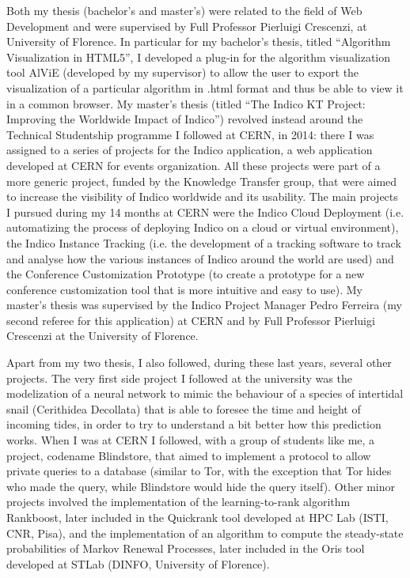 \documentclass{article}
\begin{document}
    Both my thesis (bachelor's and master's) were related to the field of Web Development and were supervised by Full Professor Pierluigi Crescenzi, at University of Florence. In particular for my bachelor's thesis, titled ``Algorithm Visualization in HTML5'', I developed a plug-in for the algorithm visualization tool AlViE (developed by my supervisor) to allow the user to export the visualization of a particular algorithm in .html format and thus be able to view it in a common browser. My master's thesis (titled ``The Indico KT Project: Improving the Worldwide Impact of Indico'') revolved instead around the Technical Studentship programme I followed at CERN, in 2014: there I was assigned to a series of projects for the Indico application, a web application developed at CERN for events organization. All these projects were part of a more generic project, funded by the Knowledge Transfer group, that were aimed to increase the visibility of Indico worldwide and its usability. The main projects I pursued during my 14 months at CERN were the Indico Cloud Deployment (i.e. automatizing the process of deploying Indico on a cloud or virtual environment), the Indico Instance Tracking (i.e. the development of a tracking software to track and analyse how the various instances of Indico around the world are used) and the Conference Customization Prototype (to create a prototype for a new conference customization tool that is more intuitive and easy to use). My master's thesis was supervised by the Indico Project Manager Pedro Ferreira (my second referee for this application) at CERN and by Full Professor Pierluigi Crescenzi at the University of Florence. \par \bigskip
    
    Apart from my two thesis, I also followed, during these last years, several other projects. The very first side project I followed at the university was the modelization of a neural network to mimic the behaviour of a species of intertidal snail (Cerithidea Decollata) that is able to foresee the time and height of incoming tides, in order to try to understand a bit better how this prediction works. When I was at CERN I followed, with a group of students like me, a project, codename Blindstore, that aimed to implement a protocol to allow private queries to a database (similar to Tor, with the exception that Tor hides who made the query, while Blindstore would hide the query itself). Other minor projects involved the implementation of the learning-to-rank algorithm Rankboost, later included in the Quickrank tool developed at HPC Lab (ISTI, CNR, Pisa), and the implementation of an algorithm to compute the steady-state probabilities of Markov Renewal Processes, later included in the Oris tool developed at STLab (DINFO, University of Florence). \par \bigskip
    
\end{document}
